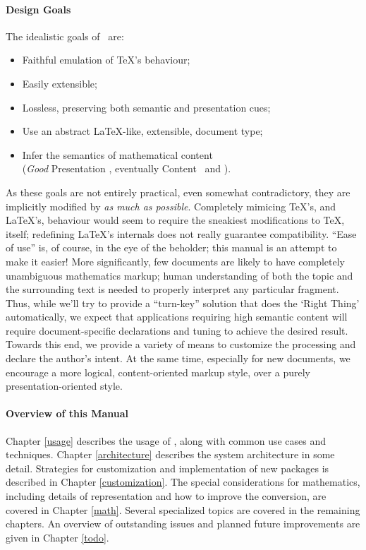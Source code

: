 \documentclass{book}
\begin{document}
\paragraph{Design Goals} The idealistic goals of \LaTeXML\ are:
\begin{itemize}
\item Faithful emulation of \TeX's behaviour;
\item Easily extensible;
\item Lossless, preserving both semantic and presentation cues;
\item Use an abstract \LaTeX-like, extensible, document type;
\item Infer the semantics of mathematical content\\
    (\emph{Good} Presentation \MathML, eventually Content \MathML\ and \OpenMath).
\end{itemize}

As these goals are not entirely practical, even somewhat contradictory,
they are implicitly modified by \emph{as much as possible}.
Completely mimicing \TeX's, and \LaTeX's, behaviour would seem to require the
sneakiest modifications to \TeX, itself; redefining \LaTeX's internals does 
not really guarantee compatibility. ``Ease of use'' is, of course, in the eye of the beholder;
this manual is an attempt to make it easier!
More significantly, few documents are likely to have completely unambiguous
mathematics markup; human understanding of both the topic and the surrounding 
text is needed to properly interpret any particular fragment.
Thus, while we'll try to provide a ``turn-key'' solution that does the `Right Thing'
automatically, we expect that applications requiring high semantic content will require
document-specific declarations and tuning to achieve the desired result.
Towards this end, we provide a variety
of means to customize the processing and declare the author's intent.
At the same time, especially for new documents, we encourage a more logical, 
content-oriented markup style, over a purely presentation-oriented style.

\paragraph[Overview]{Overview of this Manual}
Chapter \ref{usage} describes the usage of \LaTeXML, along with
common use cases and techniques.  Chapter \ref{architecture} describes
the system architecture in some detail. Strategies for customization
and implementation of new packages is described in Chapter \ref{customization}.
The special considerations for mathematics, including details of representation
and how to improve the conversion, are covered in Chapter \ref{math}.
Several specialized topics are covered in the remaining chapters.
An overview of outstanding issues and planned future improvements
are given in Chapter \ref{todo}.
\end{document}
